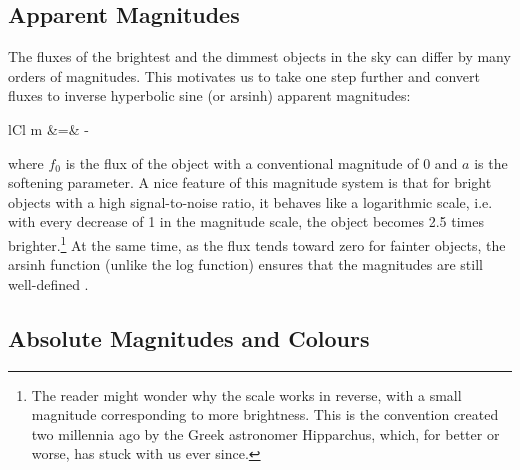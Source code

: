 \subsection{Apparent Magnitudes} 
\label{sub:apparent}

The fluxes of the brightest and the dimmest objects in the sky can differ by many orders of
magnitudes. This motivates us to take one step further and convert fluxes to inverse hyperbolic sine
(or arsinh) apparent magnitudes:
	\begin{IEEEeqnarray*}{lCl}
		m &=& - 
	\end{IEEEeqnarray*}
where $f_0$ is the flux of the object with a conventional magnitude of 0 and $a$ is the softening
parameter. A nice feature of this magnitude system is that for bright objects with a high
signal-to-noise ratio, it behaves like a logarithmic scale, i.e. with every decrease of 1 in the
magnitude scale, the object becomes 2.5 times brighter.\footnote{ The reader might wonder why the
	scale works in reverse, with a small magnitude corresponding to more brightness. This is the
	convention created two millennia ago by the Greek astronomer Hipparchus, which, for better or worse,
	has stuck with us ever since.} At the same time, as the flux tends toward zero for fainter objects,
the arsinh function (unlike the log function) ensures that the magnitudes are still well-defined
\cite{lupton99}.

\subsection{Absolute Magnitudes and Colours}  
\label{sub:colours}

